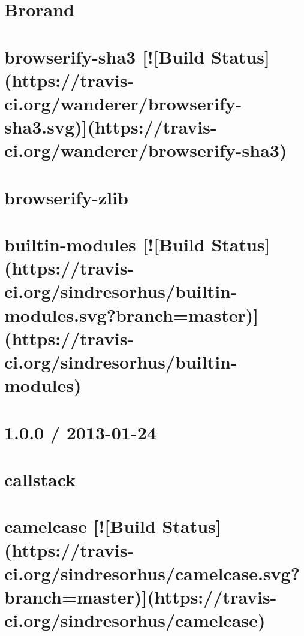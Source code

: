 \documentclass[twoside]{book}
\newcommand{\+}{\discretionary{\mbox{\scriptsize$\hookleftarrow$}}{}{}}
\begin{document}
\chapter{Brorand}
\label{md_app_web_node_modules_brorand__r_e_a_d_m_e}

\chapter{browserify-\/sha3 \mbox{[}!\mbox{[}Build Status\mbox{]}(https\+://travis-\/ci.org/wanderer/browserify-\/sha3.svg)\mbox{]}(https\+://travis-\/ci.org/wanderer/browserify-\/sha3)}
\label{md_app_web_node_modules_browserify-sha3__r_e_a_d_m_e}

\chapter{browserify-\/zlib}
\label{md_app_web_node_modules_browserify-zlib__r_e_a_d_m_e}

\chapter{builtin-\/modules \mbox{[}!\mbox{[}Build Status\mbox{]}(https\+://travis-\/ci.org/sindresorhus/builtin-\/modules.svg?branch=master)\mbox{]}(https\+://travis-\/ci.org/sindresorhus/builtin-\/modules)}
\label{md_app_web_node_modules_builtin-modules_readme}

\chapter{1.0.0 / 2013-\/01-\/24}
\label{md_app_web_node_modules_callsite__history}

\chapter{callstack}
\label{md_app_web_node_modules_callsite__readme}

\chapter{camelcase \mbox{[}!\mbox{[}Build Status\mbox{]}(https\+://travis-\/ci.org/sindresorhus/camelcase.svg?branch=master)\mbox{]}(https\+://travis-\/ci.org/sindresorhus/camelcase)}
\label{md_app_web_node_modules_camelcase_readme}

\end{document}
